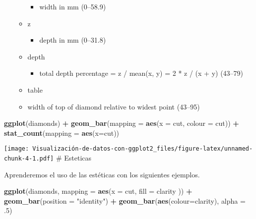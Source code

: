 \documentclass[
]{article}
\newenvironment{Shaded}{\begin{snugshade}}{\end{snugshade}}
\newcommand{\DataTypeTok}[1]{\textcolor[rgb]{0.13,0.29,0.53}{#1}}
\newcommand{\FloatTok}[1]{\textcolor[rgb]{0.00,0.00,0.81}{#1}}
\newcommand{\KeywordTok}[1]{\textcolor[rgb]{0.13,0.29,0.53}{\textbf{#1}}}
\newcommand{\NormalTok}[1]{#1}
\newcommand{\OperatorTok}[1]{\textcolor[rgb]{0.81,0.36,0.00}{\textbf{#1}}}
\newcommand{\StringTok}[1]{\textcolor[rgb]{0.31,0.60,0.02}{#1}}
\providecommand{\tightlist}{%
  \setlength{\itemsep}{0pt}\setlength{\parskip}{0pt}}
\begin{document}
\begin{itemize}
\begin{itemize}
    \begin{itemize}
    \tightlist
    \item
      width in mm (0--58.9)
    \end{itemize}
  \item
    z

    \begin{itemize}
    \tightlist
    \item
      depth in mm (0--31.8)
    \end{itemize}
  \item
    depth

    \begin{itemize}
    \tightlist
    \item
      total depth percentage = z / mean(x, y) = 2 * z / (x + y) (43--79)
    \end{itemize}
  \item
    table
  \item
    width of top of diamond relative to widest point (43--95)
  \end{itemize}
\end{itemize}

\begin{Shaded}
\begin{Highlighting}[]
\KeywordTok{ggplot}\NormalTok{(diamonds) }\OperatorTok{+}
\StringTok{  }\KeywordTok{geom\_bar}\NormalTok{(}\DataTypeTok{mapping =} \KeywordTok{aes}\NormalTok{(}\DataTypeTok{x =}\NormalTok{ cut, }\DataTypeTok{colour =}\NormalTok{ cut)) }\OperatorTok{+}
\StringTok{  }\KeywordTok{stat\_count}\NormalTok{(}\DataTypeTok{mapping =}  \KeywordTok{aes}\NormalTok{(}\DataTypeTok{x=}\NormalTok{cut))}
\end{Highlighting}
\end{Shaded}

\texttt{[image: Visualización-de-datos-con-ggplot2\_files/figure-latex/unnamed-chunk-4-1.pdf]}
\# Esteticas

Aprenderemos el uso de las estéticas con los siguientes ejemplos.

\begin{Shaded}
\begin{Highlighting}[]
\KeywordTok{ggplot}\NormalTok{(diamonds, }\DataTypeTok{mapping =} \KeywordTok{aes}\NormalTok{(}\DataTypeTok{x =}\NormalTok{ cut, }\DataTypeTok{fill =}\NormalTok{ clarity )) }\OperatorTok{+}
\StringTok{  }\KeywordTok{geom\_bar}\NormalTok{(}\DataTypeTok{position =} \StringTok{"identity"}\NormalTok{) }\OperatorTok{+}
\StringTok{  }\KeywordTok{geom\_bar}\NormalTok{(}\KeywordTok{aes}\NormalTok{(}\DataTypeTok{colour=}\NormalTok{clarity), }\DataTypeTok{alpha =} \FloatTok{.5}\NormalTok{) }
\end{Highlighting}
\end{Shaded}
\end{document}
